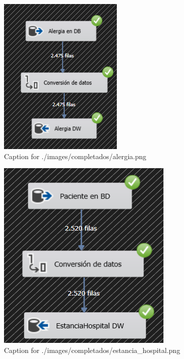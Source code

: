\documentclass{article}
\begin{document}
\begin{figure}[H]
  \centering
  \includegraphics[width=\linewidth]{./images/completados/alergia.png}
  \caption{Caption for ./images/completados/alergia.png}
\end{figure}
\begin{figure}[H]
  \centering
  \includegraphics[width=\linewidth]{./images/completados/estancia_hospital.png}
  \caption{Caption for ./images/completados/estancia_hospital.png}
\end{figure}
\end{document}
